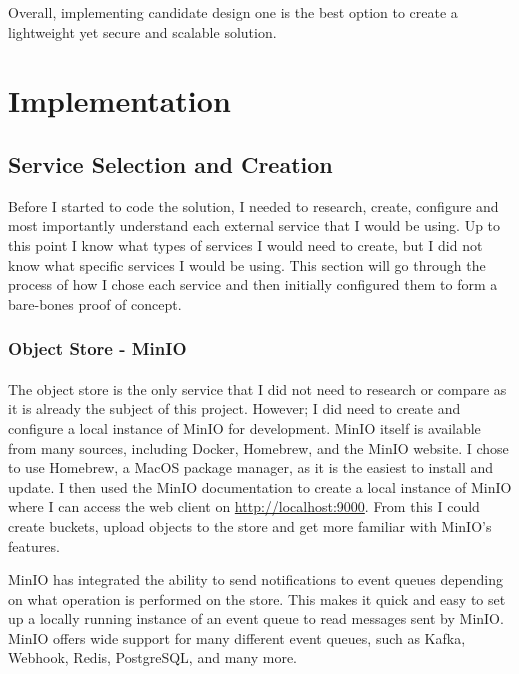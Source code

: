\documentclass[12pt, conference, final, a4paper, onecolumn, compsoc]{IEEEtran}
\begin{document}
Overall, implementing candidate design one is the best option to create a
lightweight yet secure and scalable solution.

\section{Implementation}


\subsection*{Service Selection and Creation} %


Before I started to code the solution, I needed to research, create, configure
and most importantly understand each external service that I would be using. Up
to this point I know what types of services I would need to create, but I did
not know what specific services I would be using. This section will go through
the process of how I chose each service and then initially configured them to
form a bare-bones proof of concept.

\subsubsection*{Object Store - MinIO}
\paragraph{}

The object store is the only service that I did not need to research or compare
as it is already the subject of this project. However; I did need to create and
configure a local instance of MinIO for development. MinIO itself is available
from many sources, including Docker, Homebrew, and the MinIO website. I chose to
use Homebrew, a MacOS package manager, as it is the easiest to install and
update. I then used the MinIO documentation to create a local instance of MinIO
where I can access the web client on \url{http://localhost:9000}. From this I
could create buckets, upload objects to the store and get more familiar with
MinIO's features.


MinIO has integrated the ability to send notifications to event queues depending
on what operation is performed on the store. This makes it quick and easy to set
up a locally running instance of an event queue to read messages sent by MinIO.
MinIO offers wide support for many different event queues, such as Kafka,
Webhook, Redis, PostgreSQL, and many more.
\end{document}
